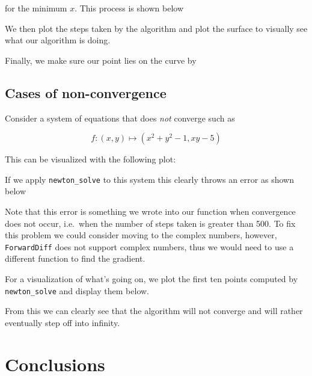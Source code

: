\documentclass[11pt]{article}
\begin{document}
for the minimum \(x\). This process is shown below


        
    We then plot the steps taken by the algorithm and plot the surface to
visually see what our algorithm is doing.


    
    Finally, we make sure our point lies on the curve by


        
    \hypertarget{cases-of-non-convergence}{%
\subsection{Cases of non-convergence}\label{cases-of-non-convergence}}

Consider a system of equations that does \emph{not} converge such as

\begin{equation}
f : (x, y) \mapsto (x^2 + y^2 - 1, xy - 5)
\end{equation}

This can be visualized with the following plot:

 
    
    If we apply \texttt{newton\_solve} to this system this clearly throws an
error as shown below



    Note that this error is something we wrote into our function when
convergence does not occur, i.e.~when the number of steps taken is
greater than 500. To fix this problem we could consider moving to the
complex numbers, however, \texttt{ForwardDiff} does not support complex
numbers, thus we would need to use a different function to find the
gradient.

For a visualization of what's going on, we plot the first ten points
computed by \texttt{newton\_solve} and display them below.



    
    From this we can clearly see that the algorithm will not converge and
will rather eventually step off into infinity.

\section{Conclusions}
\end{document}
